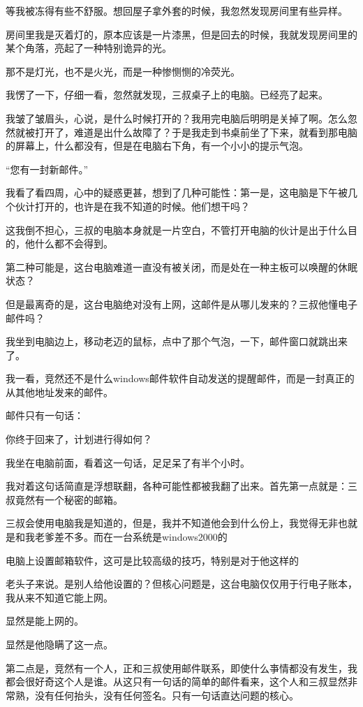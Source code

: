 等我被冻得有些不舒服。想回屋子拿外套的时候，我忽然发现房间里有些异样。

房间里我是灭着灯的，原本应该是一片漆黑，但是回去的时候，我就发现房间里的某个角落，亮起了一种特别诡异的光。

那不是灯光，也不是火光，而是一种惨恻恻的冷荧光。

我愣了一下，仔细一看，忽然就发现，三叔桌子上的电脑。已经亮了起来。

我皱了皱眉头，心说，是什么时候打开的？我用完电脑后明明是关掉了啊。怎么忽然就被打开了，难道是出什么故障了？于是我走到书桌前坐了下来，就看到那电脑的屏幕上，什么都没有，但是在电脑右下角，有一个小小的提示气泡。

“您有一封新邮件。”

我看了看四周，心中的疑惑更甚，想到了几种可能性：第一是，这电脑是下午被几个伙计打开的，也许是在我不知道的时候。他们想干吗？

这我倒不担心，三叔的电脑本身就是一片空白，不管打开电脑的伙计是出于什么目的，他什么都不会得到。

第二种可能是，这台电脑难道一直没有被关闭，而是处在一种主板可以唤醒的休眠状态？

但是最离奇的是，这台电脑绝对没有上网，这邮件是从哪儿发来的？三叔他懂电子邮件吗？

我坐到电脑边上，移动老迈的鼠标，点中了那个气泡，一下，邮件窗口就跳出来了。

我一看，竞然还不是什么windows邮件软件自动发送的提醒邮件，而是一封真正的从其他地址发来的邮件。

邮件只有一句话：

你终于回来了，计划进行得如何？

我坐在电脑前面，看着这一句话，足足呆了有半个小时。

我对着这句话简直是浮想联翻，各种可能性都被我翻了出来。首先第一点就是：三叔竟然有一个秘密的邮箱。

三叔会使用电脑我是知道的，但是，我并不知道他会到什么份上，我觉得无非也就是和我老爹差不多。而在一台系统是windows2000的

电脑上设置邮箱软件，这可是比较高级的技巧，特别是对于他这样的

老头子来说。是别人给他设置的？但核心问题是，这台电脑仅仅用于行电子账本，我从来不知道它能上网。

显然是能上网的。

显然是他隐瞒了这一点。

第二点是，竞然有一个人，正和三叔使用邮件联系，即使什么亊情都没有发生，我都会很好奇这个人是谁。从这只有一句话的简单的邮件看来，这个人和三叔显然非常熟，没有任何抬头，没有任何签名。只有一句话直达问题的核心。

